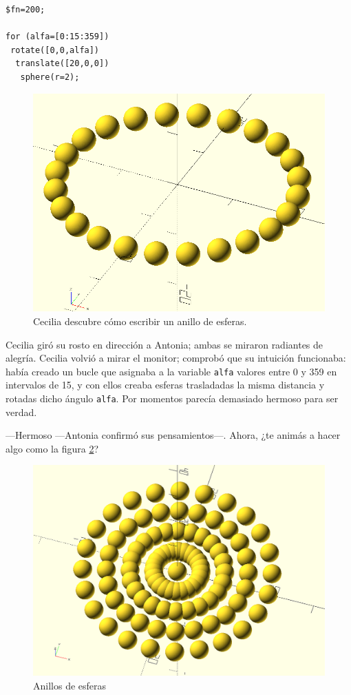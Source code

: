 \begin{lstlisting}
$fn=200;

for (alfa=[0:15:359])
 rotate([0,0,alfa])
  translate([20,0,0])
   sphere(r=2);
    \end{lstlisting}%

    \begin{figure}[ht]
      \centering
      \includegraphics[width=.5\textwidth]{imagenes/anillo-de-esferas}      
      \caption{Cecilia descubre cómo escribir un anillo de esferas.}
      \label{fig:anillo-de-esferas}
    \end{figure}

    Cecilia giró su rosto en dirección a Antonia; ambas se miraron
    radiantes de alegría. Cecilia volvió a mirar el monitor; comprobó
    que su intuición funcionaba: había creado un bucle que asignaba a
    la variable \texttt{alfa} valores entre 0 y 359 en intervalos de
    15, y con ellos creaba esferas trasladadas la misma distancia y
    rotadas dicho ángulo \texttt{alfa}. Por momentos parecía demasiado
    hermoso para ser verdad.


  ---Hermoso ---Antonia confirmó sus pensamientos---.  Ahora, ¿te
  animás a hacer algo como la figura \ref{fig:anillos-de-esferas}?
  
    \begin{figure}[ht]
    \centering
    \includegraphics[width=.65\textwidth]{imagenes/anillos-de-esferas}    
    \caption{Anillos de esferas}
    \label{fig:anillos-de-esferas}
  \end{figure}



